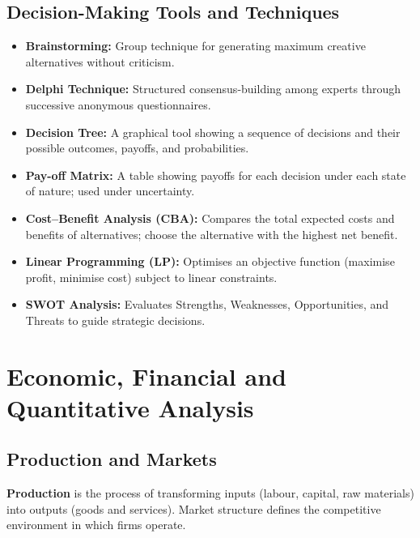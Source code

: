 \documentclass[12pt,a4paper]{article}
\begin{document}
\subsection{Decision-Making Tools and Techniques}

\begin{itemize}[leftmargin=*, itemsep=3pt]
  \item \textbf{Brainstorming:} Group technique for generating maximum creative alternatives without criticism.
  \item \textbf{Delphi Technique:} Structured consensus-building among experts through successive anonymous questionnaires.
  \item \textbf{Decision Tree:} A graphical tool showing a sequence of decisions and their possible outcomes, payoffs, and probabilities.
  \item \textbf{Pay-off Matrix:} A table showing payoffs for each decision under each state of nature; used under uncertainty.
  \item \textbf{Cost--Benefit Analysis (CBA):} Compares the total expected costs and benefits of alternatives; choose the alternative with the highest net benefit.
  \item \textbf{Linear Programming (LP):} Optimises an objective function (maximise profit, minimise cost) subject to linear constraints.
  \item \textbf{SWOT Analysis:} Evaluates Strengths, Weaknesses, Opportunities, and Threats to guide strategic decisions.
\end{itemize}

\section{Economic, Financial and Quantitative Analysis}

\subsection{Production and Markets}

\begin{tcolorbox}[defbox, title={\textbf{Production and Market Structures}}]
\textbf{Production} is the process of transforming inputs (labour, capital, raw materials) into outputs (goods and services). Market structure defines the competitive environment in which firms operate.
\end{tcolorbox}
\end{document}
